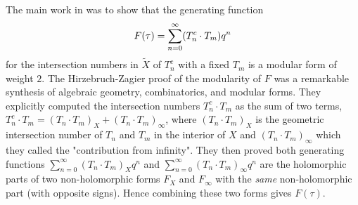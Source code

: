 The main work in \cite{HZ} was to show that the generating function
\[\vspace{-.1cm}
F(\tau) = \sum_{n=0}^{\infty} (T_n^c \cdot T_m) q^n \vspace{-.1cm}
\]
for the intersection numbers in $\tilde{X}$ of $T^c_n$ with a fixed
$T_m$ is a modular form of weight $2$. The Hirzebruch-Zagier proof
of the modularity of $F$ was a remarkable synthesis of algebraic
geometry, combinatorics, and modular forms. They explicitly computed
the intersection numbers $T_n^c \cdot T_m$ as the sum of two terms,
$T_n^c \cdot T_m = (T_n \cdot T_m)_X  + ({T}_n \cdot {T}_m)_{\infty}$,
where $(T_n \cdot T_m)_X $ is the geometric intersection number of
$T_n$ and $T_m$ in the interior of $X$ and $({T}_n \cdot {T}_m)_{\infty}$
which they called the "contribution from infinity". They then proved
both generating functions $\sum_{n=0}^{\infty} (T_n \cdot T_m)_X
q^n$ and $\sum_{n=0}^{\infty}  (T_n \cdot T_m)_{\infty} q^n$ are
the holomorphic parts of two non-holomorphic forms $F_X$ and
$F_{\infty}$ with the {\it same} non-holomorphic part (with opposite
signs). Hence combining these two forms gives $F(\tau)$.

